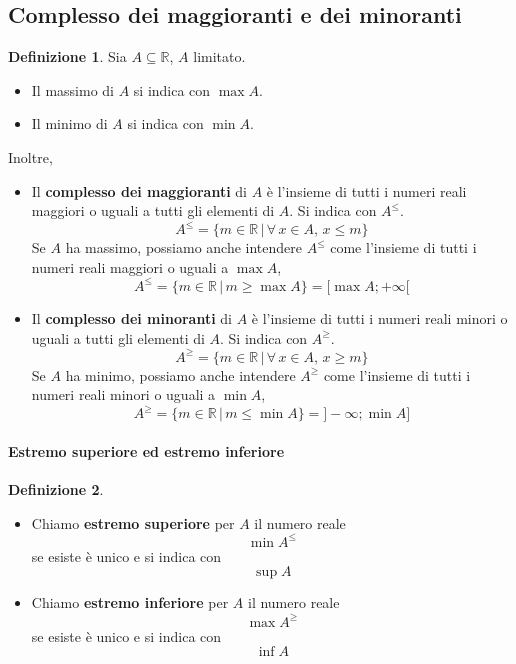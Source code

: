\documentclass{article}
\theoremstyle{plain}
\theoremstyle{definition}
\newtheorem{defn}{Definizione}[section]
\theoremstyle{remark}
\begin{document}
\subsection{Complesso dei maggioranti e dei minoranti}
\begin{bxthm}
\begin{defn}
    Sia $A\subseteq\mathbb{R}$, $A$ limitato.
    \begin{itemize}
        \item Il massimo di $A$ si indica con $\max A$.
        \item Il minimo di $A$ si indica con $\min A$.
    \end{itemize}
    Inoltre, 
        \begin{itemize}
            \item Il \textbf{complesso dei maggioranti} di $A$ è l'insieme di tutti i numeri reali maggiori o uguali a tutti gli elementi di $A$. Si indica con $A^{\leq}$.
            \[A^\leq=\{m\in\mathbb{R}\,|\,\forall\, x\in A,\, x\leq m\}\]
            Se $A$ ha massimo, possiamo anche intendere $A^\leq$ come l'insieme di tutti i numeri reali maggiori o uguali a $\max A$,
            \[A^\leq=\{m\in\mathbb{R}\,|\,m\geq\max A\}=[\max A;+\infty[\]

            \item Il \textbf{complesso dei minoranti} di $A$ è l'insieme di tutti i numeri reali minori o uguali a tutti gli elementi di $A$. Si indica con $A^{\geq}$.
            \[A^\geq=\{m\in\mathbb{R}\,|\,\forall\, x\in A,\, x\geq m\}\]
            Se $A$ ha minimo, possiamo anche intendere $A^\geq$ come l'insieme di tutti i numeri reali minori o uguali a $\min A$,
            \[A^\geq=\{m\in\mathbb{R}\,|\,m\leq\min A\}=]-\infty;\min A]\]
        \end{itemize}
\end{defn}
\end{bxthm}

\vspace{10pt}

\paragraph{Estremo superiore ed estremo inferiore}
\begin{bxthm}
\begin{defn}\hfill
    \begin{itemize}
        \item Chiamo \textbf{estremo superiore} per $A$ il numero reale \[\min A^\leq\] se esiste è unico e si indica con \[\sup A\]
        \item Chiamo \textbf{estremo inferiore} per $A$ il numero reale \[\max A^\geq\] se esiste è unico e si indica con \[\inf A\]
    \end{itemize}    
\end{defn}
\end{bxthm}
\end{document}
